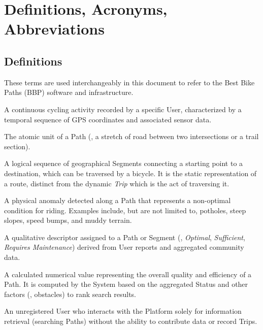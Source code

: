 \section{Definitions, Acronyms, Abbreviations}

\subsection{Definitions}
\begin{description}[noitemsep]
    \item [System, Platform] These terms are used interchangeably in this document to refer to the Best Bike Paths (BBP) software and infrastructure.
    
    \item [Trip] A continuous cycling activity recorded by a specific User, characterized by a temporal sequence of GPS coordinates and associated sensor data.

    \item [Segment] The atomic unit of a Path (\eg, a stretch of road between two intersections or a trail section). 
    
    \item [Path] A logical sequence of geographical Segments connecting a starting point to a destination, which can be traversed by a bicycle. It is the static representation of a route, distinct from the dynamic \emph{Trip} which is the act of traversing it.
    
    
    \item [Obstacle] A physical anomaly detected along a Path that represents a non-optimal condition for riding. Examples include, but are not limited to, potholes, steep slopes, speed bumps, and muddy terrain.
    
    \item [Status] A qualitative descriptor assigned to a Path or Segment (\eg, \emph{Optimal}, \emph{Sufficient}, \emph{Requires Maintenance}) derived from User reports and aggregated community data.
    
    \item [Score] A calculated numerical value representing the overall quality and efficiency of a Path. It is computed by the System based on the aggregated Status and other factors (\eg, obstacles) to rank search results.
    
    \item [Guest] An unregistered User who interacts with the Platform solely for information retrieval (searching Paths) without the ability to contribute data or record Trips.
\end{description}

